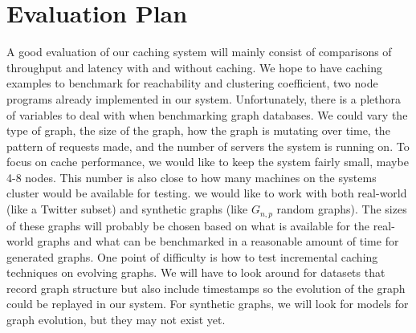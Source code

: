 \documentclass[letterpaper,twocolumn,11pt,tight]{article}
\begin{document}
\section{Evaluation Plan}\label{sec:design}
A good evaluation of our caching system will mainly consist of comparisons of throughput and latency with and without caching. We hope to have caching examples to benchmark for reachability and clustering coefficient, two node programs already implemented in our system. Unfortunately, there is a plethora of variables to deal with when benchmarking graph databases. We could vary the type of graph, the size of the graph, how the graph is mutating over time, the pattern of requests made, and the number of servers the system is running on. To focus on cache performance, we would like to keep the system fairly small, maybe 4-8 nodes. This number is also close to how many machines on the systems cluster would be available for testing. we would like to work with both real-world (like a Twitter subset) and synthetic graphs (like $G_{n,p}$ random graphs). The sizes of these graphs will probably be chosen based on what is available for the real-world graphs and what can be benchmarked in a reasonable amount of time for generated graphs. One point of difficulty is how to test incremental caching techniques on evolving graphs. We will have to look around for datasets that record graph structure but also include timestamps so the evolution of the graph could be replayed in our system. For synthetic graphs, we will look for models for graph evolution, but they may not exist yet.


\footnotesize

\end{document}
